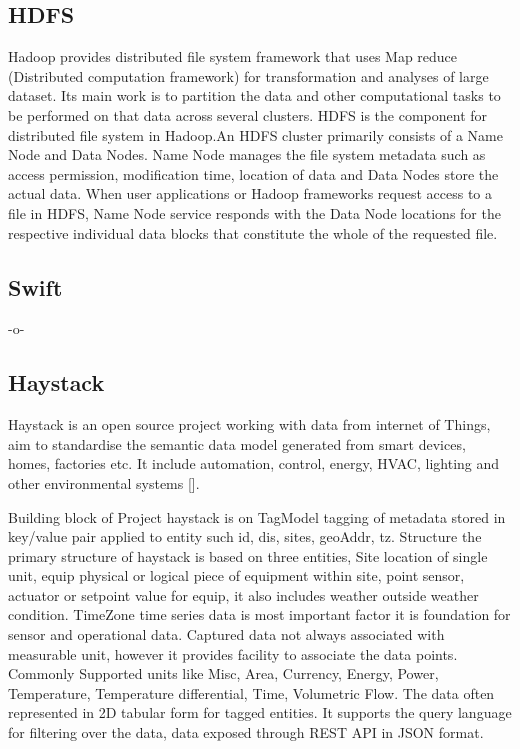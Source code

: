 \subsection{HDFS}
     
Hadoop provides distributed file system framework that uses Map reduce
(Distributed computation framework) for transformation and analyses of
large dataset.  Its main work is to partition the data and other
computational tasks to be performed on that data across several
clusters.  HDFS is the component for distributed file system in
Hadoop.An HDFS cluster primarily consists of a Name Node and Data
Nodes. Name Node manages the file system metadata such as access
permission, modification time, location of data and Data Nodes store
the actual data.  When user applications or Hadoop frameworks request
access to a file in HDFS, Name Node service responds with the Data
Node locations for the respective individual data blocks that
constitute the whole of the requested file\cite{www-hdfs}.

\subsection{Swift}

-o-

\subsection{Haystack}

Haystack is an open source project working with data from internet of
Things, aim to standardise the semantic data model generated from
smart devices, homes, factories etc.  It include automation, control,
energy, HVAC, lighting and other environmental systems
 [\cite{www-project-haystack}].
     
Building block of Project haystack is on TagModel tagging of metadata
stored in key/value pair applied to entity such id, dis, sites,
geoAddr, tz. Structure the primary structure of haystack is based on
three entities, Site location of single unit, equip physical or
logical piece of equipment within site, point sensor, actuator or
setpoint value for equip, it also includes weather outside weather
condition. TimeZone time series data is most important factor it is
foundation for sensor and operational data. Captured data not always
associated with measurable unit, however it provides facility to
associate the data points.  Commonly Supported units like Misc, Area,
Currency, Energy, Power, Temperature, Temperature differential, Time,
Volumetric Flow. The data often represented in 2D tabular form for
tagged entities. It supports the query language for filtering over the
data, data exposed through REST API in JSON format.

